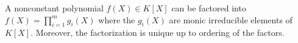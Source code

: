 A nonconstant polynomial $f(X) \in K[X]$ can be factored into $f(X) = \prod_{i=1}^m g_i(X)$ where the $g_i(X)$ are monic irreducible elements of $K[X]$. Moreover, the factorization is unique up to ordering of the factors.
